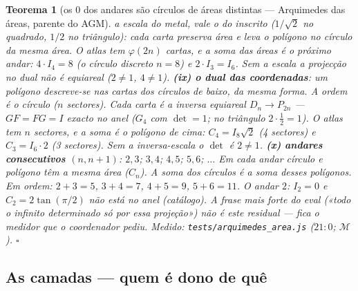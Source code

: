 \documentclass[11pt,a4paper]{article}
\newtheorem{teorema}{Teorema}
\newcommand{\code}[1]{\texttt{\small #1}}
\begin{document}
\begin{teorema}[os $0$ dos andares são círculos de áreas distintas ---
Arquimedes das áreas, parente do AGM]
a escala do metal, vale o do inscrito ($1/\sqrt2$ no quadrado,
$1/2$ no triângulo): cada carta preserva área e leva o polígono no
círculo da mesma área. O atlas tem $\varphi(2n)$ cartas, e a soma das
áreas é o próximo andar: $4\cdot I_{4}=8$ (o círculo discreto $n=8$)
e $2\cdot I_{3}=I_{6}$. Sem a escala a projecção no dual \emph{não}
é equiareal ($2\neq1$, $4\neq1$).
\textbf{(ix) o dual das coordenadas}: um polígono descreve-se nas
cartas dos círculos de baixo, da mesma forma. A \emph{ordem} é o
círculo ($n$ sectores). Cada carta é a inversa equiareal
$D_{n}\to P_{2n}$ --- $GF=FG=I$ exacto no anel ($G_{4}$ com
$\det=1$; no triângulo $2\cdot\tfrac12=1$). O atlas tem $n$
sectores, e a soma é o polígono de cima:
$C_{4}=I_{8}\sqrt2$ (4 sectores) e $C_{3}=I_{6}\cdot 2$ (3 sectores).
Sem a inversa-escala o $\det$ é $2\neq1$.
\textbf{(x) andares consecutivos $(n,n{+}1)$}: $2,3$; $3,4$; $4,5$;
$5,6$; $\ldots$
Em cada andar círculo e polígono têm a \emph{mesma área} ($C_{n}$).
A soma dos círculos é a soma desses polígonos. Em ordem:
$2{+}3=5$, $3{+}4=7$, $4{+}5=9$, $5{+}6=11$.
O andar $2$: $I_{2}=0$ e $C_{2}=2\tan(\pi/2)$ não está no anel
(catálogo).
A frase mais forte do eval («todo o infinito determinado só por essa
projeção») \emph{não} é este residual --- fica o medidor que o
coordenador pediu.
\emph{Medido:} \code{tests/arquimedes\_area.js} ($21{:}0$; $\mathcal{M}$).
$\square$
\end{teorema}

\subsection*{As camadas --- quem é dono de quê}\label{sec:camadas-operacoes}
\end{document}
